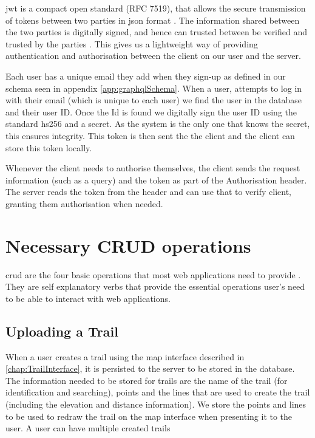 \acrshort{jwt} is a compact open standard (RFC 7519), that allows the secure transmission of tokens between two parties in  \acrshort{json} format \cite{jones2015json}. The information shared between the two parties is digitally signed, and hence can trusted between be verified and trusted by the parties \cite{auth02019json}. This gives us a lightweight way of providing authentication and authorisation between the client on our user and the server.

Each user has a unique email they add when they sign-up as defined in our schema seen in appendix \ref{app:graphqlSchema}. When a user, attempts to log in with their email (which is unique to each user) we find the user in the database and their user ID. Once the Id is found we digitally sign the user ID using the standard \acrfull{hs256} and a secret. As the system is the only one that knows the secret, this ensures integrity. This token is then sent the the client and the client can store this token locally.

Whenever the client needs to authorise themselves, the client sends the request information (such as a query) and the token as part of the Authorisation header. The server reads the token from the header and can use that to verify client, granting them authorisation when needed.

\section{Necessary CRUD operations}
\acrfull{crud} are the four basic operations that most web applications need to provide \cite{codeacademy2019crud}. They are self explanatory verbs that provide the essential operations user's need to be able to interact with web applications.

\subsection{Uploading a Trail}
When a user creates a trail using the map interface described in \autoref{chap:TrailInterface}, it is persisted to the server to be stored in the database. The information needed to be stored for trails are the name of the trail (for identification and searching), points and the lines that are used to create the trail (including the elevation and distance information). We store the points and lines to be used to redraw the trail on the map interface when presenting it to the user. A user can have multiple created trails

